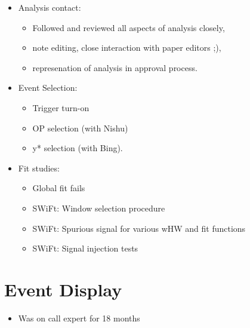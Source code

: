 \begin{itemize}
\item{Analysis contact:}
  \begin{itemize}[label={$-$}]
  \item{Followed and reviewed all aspects of analysis closely,}
  \item{note editing, close interaction with paper editors ;),}
  \item{represenation of analysis in approval process.}
  \end{itemize}
\item{Event Selection:}
  \begin{itemize}[label={$-$}]
  \item{Trigger turn-on}
  \item{OP selection (with Nishu)}
  \item{y* selection (with Bing). }
  \end{itemize}
\item{Fit studies:}
  \begin{itemize}[label={$-$}]
  \item{Global fit fails}
  \item{SWiFt: Window selection procedure}
  \item{SWiFt: Spurious signal for various wHW and fit functions}
  \item{SWiFt: Signal injection tests}
  \end{itemize}
\end{itemize}

\section{Event Display}
\begin{itemize}
  \item{Was on call expert for 18 months}
\end{itemize}
